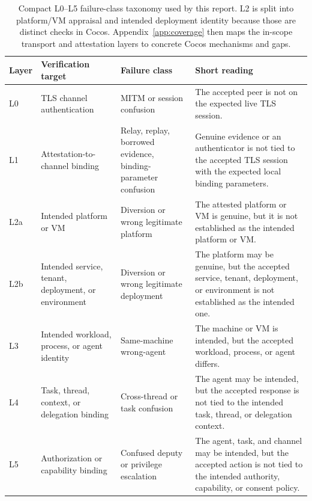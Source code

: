 \documentclass[11pt,a4paper]{article}
\begin{document}
\begin{table}[H]
\centering
\footnotesize
\begin{tabularx}{\textwidth}{@{}>{\raggedright\arraybackslash}p{}>{\raggedright\arraybackslash}p{}>{\raggedright\arraybackslash}p{}>{\raggedright\arraybackslash}X@{}}
\toprule
\textbf{Layer} & \textbf{Verification target} & \textbf{Failure class} & \textbf{Short reading} \\
\midrule
L0 & TLS channel authentication & MITM or session confusion & The accepted peer is not on the expected live TLS session. \\
L1 & Attestation-to-channel binding & Relay, replay, borrowed evidence, binding-parameter confusion & Genuine evidence or an authenticator is not tied to the accepted TLS session with the expected local binding parameters. \\
L2a & Intended platform or VM & Diversion or wrong legitimate platform & The attested platform or VM is genuine, but it is not established as the intended platform or VM. \\
L2b & Intended service, tenant, deployment, or environment & Diversion or wrong legitimate deployment & The platform may be genuine, but the accepted service, tenant, deployment, or environment is not established as the intended one. \\
L3 & Intended workload, process, or agent identity & Same-machine wrong-agent & The machine or VM is intended, but the accepted workload, process, or agent differs. \\
L4 & Task, thread, context, or delegation binding & Cross-thread or task confusion & The agent may be intended, but the accepted response is not tied to the intended task, thread, or delegation context. \\
L5 & Authorization or capability binding & Confused deputy or privilege escalation & The agent, task, and channel may be intended, but the accepted action is not tied to the intended authority, capability, or consent policy. \\
\bottomrule
\end{tabularx}
\caption{Compact L0--L5 failure-class taxonomy used by this report. L2 is split into platform/VM appraisal and intended deployment identity because those are distinct checks in Cocos. Appendix~\ref{app:coverage} then maps the in-scope transport and attestation layers to concrete Cocos mechanisms and gaps.}
\label{tab:threat-taxonomy}
\end{table}
\end{document}
